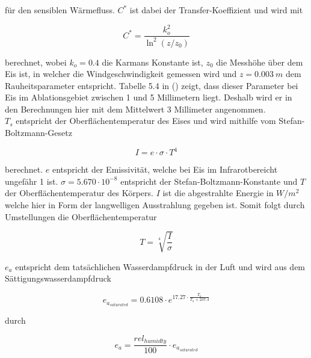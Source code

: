 \documentclass[11pt,a4paper]{article}
\begin{document}
für den sensiblen Wärmefluss. $C^*$ ist dabei der Transfer-Koeffizient und wird mit 

\begin{equation}\label{eq:Transfer-Koeffizient}
C^{*}=\frac{k_{o}^{2}}{\ln ^{2}\left(z / z_{0}\right)}
\end{equation}

berechnet, wobei $k_{o}=0.4$ die Karmans Konstante ist, $z_{0}$ die Messhöhe über dem Eis ist, in welcher die Windgeschwindigkeit gemessen wird und $z=0.003~m$ dem Rauheitsparameter entspricht. Tabelle 5.4 in \citeauthor{ThePhysicsOfGlaciers} (\citeyear[155]{ThePhysicsOfGlaciers}) zeigt, dass dieser Parameter bei Eis im Ablationsgebiet zwischen 1 und 5 Millimetern liegt. Deshalb wird er in den Berechnungen hier mit dem Mittelwert 3 Millimeter angenommen.\\ %

$T_s$ entspricht der Oberflächentemperatur des Eises und wird mithilfe vom Stefan-Boltzmann-Gesetz 

\begin{equation}\label{eq:Boltzmann-Gesetz}
I = e \cdot \sigma \cdot T^4
\end{equation}

berechnet. $e$ entspricht der Emissivität, welche bei Eis im Infrarotbereicht ungefähr 1 ist. $\sigma=5.670 \cdot 10^{-8}$ entspricht der Stefan-Boltzmann-Konstante und $T$ der Oberflächentemperatur des Körpers. $I$ ist die abgestrahlte Energie in $W/m^2$ welche hier in Form der langwelligen Ausstrahlung gegeben ist. Somit folgt durch Umstellungen die Oberflächentemperatur

\begin{equation}\label{eq:Oberflächentemperatur}
T = \sqrt[4]{\frac{I}{\sigma}}
\end{equation}


$e_a$ entspricht dem tatsächlichen Wasserdampfdruck in der Luft und wird aus dem Sättigungswasserdampfdruck


\begin{equation}
e_{a_{saturated}}=0.6108 \cdot e^{17.27 \cdot \frac{T_a}{T_a + 237.3}}
\end{equation}

durch

\begin{equation}
e_a = \frac{rel_{humidty}}{100} \cdot e_{a_{saturated}}
\end{equation}
\end{document}
